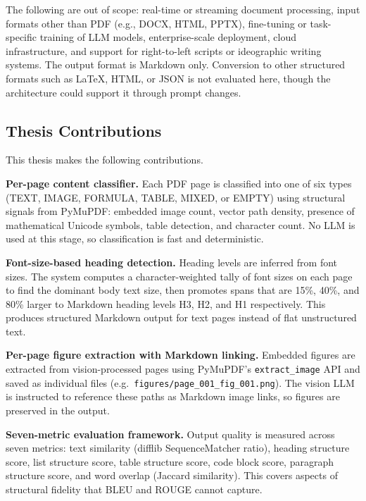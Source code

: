 \documentclass[12pt]{article}
\begin{document}
The following are out of scope: real-time or streaming document processing,
input formats other than PDF (e.g., DOCX, HTML, PPTX), fine-tuning or
task-specific training of LLM models, enterprise-scale deployment, cloud
infrastructure, and support for right-to-left scripts or ideographic writing
systems. The output format is Markdown only. Conversion to other structured
formats such as LaTeX, HTML, or JSON is not evaluated here, though the
architecture could support it through prompt changes.

\subsection{Thesis Contributions}

This thesis makes the following contributions.

\textbf{Per-page content classifier.} Each PDF page is classified into one
of six types (TEXT, IMAGE, FORMULA, TABLE, MIXED, or EMPTY) using structural
signals from PyMuPDF: embedded image count, vector path density, presence of
mathematical Unicode symbols, table detection, and character count. No LLM
is used at this stage, so classification is fast and deterministic.

\textbf{Font-size-based heading detection.} Heading levels are inferred from
font sizes. The system computes a character-weighted tally of font sizes on
each page to find the dominant body text size, then promotes spans that are
15\%, 40\%, and 80\% larger to Markdown heading levels H3, H2, and H1
respectively. This produces structured Markdown output for text pages
instead of flat unstructured text.

\textbf{Per-page figure extraction with Markdown linking.} Embedded figures
are extracted from vision-processed pages using PyMuPDF's
\texttt{extract\_image} API and saved as individual files (e.g.\
\texttt{figures/page\_001\_fig\_001.png}). The vision LLM is instructed to
reference these paths as Markdown image links, so figures are preserved in
the output.

\textbf{Seven-metric evaluation framework.} Output quality is measured across
seven metrics: text similarity (difflib SequenceMatcher ratio), heading
structure score, list structure score, table structure score, code block
score, paragraph structure score, and word overlap (Jaccard similarity). This
covers aspects of structural fidelity that BLEU and ROUGE cannot capture.
\end{document}
